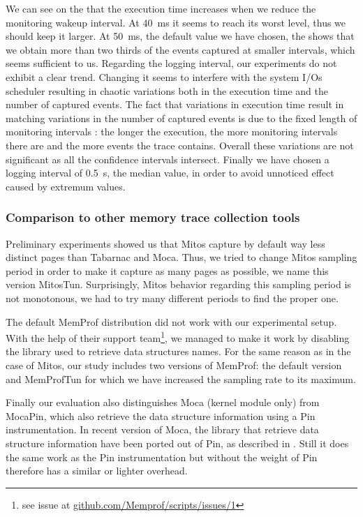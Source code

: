 We can see on the  that the execution time increases when we reduce the monitoring wakeup interval.
At \SI{40}{ms} it seems to reach its worst level, thus we should keep it larger.
At \SI{50}{ms}, the default value we have chosen, the  shows that we obtain more than two thirds of the events captured at smaller intervals, which seems sufficient to us.
Regarding the logging interval, our experiments do not exhibit a clear trend.
Changing it seems to interfere with the system I/Os scheduler resulting in chaotic variations both in the execution time and the number of captured events.
The fact that variations in execution time result in matching variations in the number of captured events is due to the fixed length of monitoring intervals : the longer the execution, the more monitoring intervals there are and the more events the trace contains.
Overall these variations are not significant as all the confidence intervals intersect.
Finally we have chosen a logging interval of \SI{0.5}{s}, the median value, in order to avoid unnoticed effect caused by extremum values.

\subsubsection{Comparison to other memory trace collection tools}

Preliminary experiments showed us that \gls{Mitos} capture by default way less distinct pages than \gls{Tabarnac} and \gls{Moca}.
Thus, we tried to change \gls{Mitos} sampling period in order to make it capture as many pages as possible, we name this version MitosTun.
Surprisingly, \gls{Mitos} behavior regarding this sampling period is not monotonous, we had to try many different periods to find the proper one.

The default \gls{MemProf} distribution did not work with our experimental setup.
With the help of their support team\footnote{
    see issue at \href{https://github.com/Memprof/scripts/issues/1}{github.com/Memprof/scripts/issues/1}
}, we managed to make it work by disabling the library used to retrieve data structures names.
For the same reason as in the case of \gls{Mitos}, our study includes two versions of \gls{MemProf}: the default version and MemProfTun for which we have increased the sampling rate to its maximum.

Finally our evaluation also distinguishes \gls{Moca} (kernel module only) from MocaPin, which also retrieve the data structure information using a \gls{Pin} instrumentation.
In recent version of \gls{Moca}, the library that retrieve data structure information have been ported out of \gls{Pin}, as described in .
Still it does the same work as the \gls{Pin} instrumentation but without the weight of \gls{Pin} therefore has a similar or lighter overhead.

